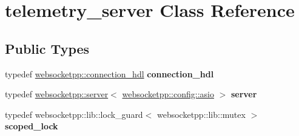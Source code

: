 \hypertarget{classtelemetry__server}{}\section{telemetry\+\_\+server Class Reference}
\label{classtelemetry__server}
\subsection*{Public Types}
\begin{DoxyCompactItemize}
\item 
typedef \hyperlink{namespacewebsocketpp_a6b3d26a10ee7229b84b776786332631d}{websocketpp\+::connection\+\_\+hdl} {\bfseries connection\+\_\+hdl}\hypertarget{classtelemetry__server_af7e7b04e711629c5af1cd03ccfdb0bee}{}\label{classtelemetry__server_af7e7b04e711629c5af1cd03ccfdb0bee}

\item 
typedef \hyperlink{classwebsocketpp_1_1server}{websocketpp\+::server}$<$ \hyperlink{structwebsocketpp_1_1config_1_1asio}{websocketpp\+::config\+::asio} $>$ {\bfseries server}\hypertarget{classtelemetry__server_a1663d7273586e751600999fd3af69d44}{}\label{classtelemetry__server_a1663d7273586e751600999fd3af69d44}

\item 
typedef websocketpp\+::lib\+::lock\+\_\+guard$<$ websocketpp\+::lib\+::mutex $>$ {\bfseries scoped\+\_\+lock}\hypertarget{classtelemetry__server_a252b02837b9ff00008f9214b99359dd9}{}\label{classtelemetry__server_a252b02837b9ff00008f9214b99359dd9}

\end{DoxyCompactItemize}
